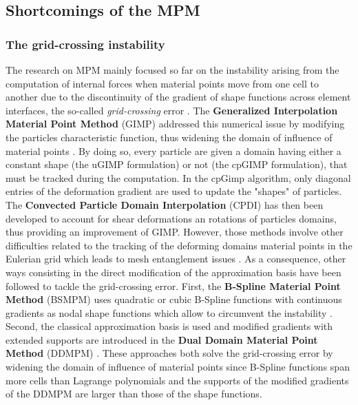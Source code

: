 \subsection{Shortcomings of the MPM}


\subsubsection*{The grid-crossing instability}
The research on MPM mainly focused so far on the instability arising from the computation of internal forces when material points move from one cell to another due to the discontinuity of the gradient of shape functions across element interfaces, the so-called \textit{grid-crossing} error \cite{Gimp}. The \textbf{Generalized Interpolation Material Point Method} (GIMP) addressed this numerical issue by modifying the particles characteristic function, thus widening the domain of influence of material points \cite{Gimp}. By doing so, every particle are given a domain having either a constant shape (the uGIMP formulation) or not (the cpGIMP formulation), that must be tracked during the computation. In the cpGimp algorithm, only diagonal entries of the deformation gradient are used to update the "shapes" of particles. The \textbf{Convected Particle Domain Interpolation} (CPDI) \cite{CPDI} has then been developed to account for shear deformations an rotations of particles domains, thus providing an improvement of GIMP. However, those methods involve other difficulties related to the tracking of the deforming domains material points in the Eulerian grid which leads to mesh entanglement issues \cite{DDMPM0}. As a consequence, other ways consisting in the direct modification of the approximation basis have been followed to tackle the grid-crossing error. First, the \textbf{B-Spline Material Point Method} (BSMPM) \cite{Steffen_quadError} uses quadratic or cubic B-Spline functions with continuous gradients as nodal shape functions which allow to circumvent the instability \cite{MPM_BSpline1}. Second, the classical approximation basis is used and modified gradients with extended supports are introduced in the \textbf{Dual Domain Material Point Method} (DDMPM) \cite{DDMPM0}. These approaches both solve the grid-crossing error by widening the domain of influence of material points since B-Spline functions span more cells than Lagrange polynomials and the supports of the modified gradients of the DDMPM are larger than those of the shape functions.  

